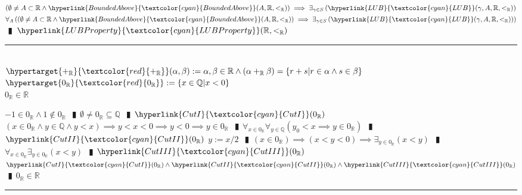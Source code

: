 \documentclass{book}
\newcommand{\df}[1]{\hypertarget{#1}{\textcolor{red}{#1}}}
\newcommand{\wff}[1]{\hypertarget{#1}{\fbox{\textcolor{red}{$#1$}}\phantom{--}}}
\newcommand{\rf}[1]{\hyperlink{#1}{\textcolor{cyan}{#1}}}
\newcommand{\abr}{:=}
\newcommand{\pipe}{$\phantom{(}\vrectangleblack\phantom{)}$}
\newcommand{\pr}[1]{\left(#1\right)}
\begin{document}
\begin{enumerate}
\begin{enumerate}
  \end{enumerate}  
  \lit $\pr{\emptyset \neq A \subset \mathbb{R} \land \rf{BoundedAbove}(A, \mathbb{R}, <_{\mathbb{R}})} \implies \exists_{\gamma \in S}\pr{\rf{LUB}(\gamma, A, \mathbb{R}, <_{\mathbb{R}})}$
  \lit $\forall_{A}\pr{\pr{\emptyset \neq A \subset \mathbb{R} \land \rf{BoundedAbove}(A, \mathbb{R}, <_{\mathbb{R}})} \implies \exists_{\gamma \in S}\pr{\rf{LUB}(\gamma, A, \mathbb{R}, <_{\mathbb{R}})}}$ \pipe $\rf{LUBProperty}(\mathbb{R}, <_{\mathbb{R}})$
\end{enumerate} \vspace{.75mm} \hrule \vspace{.75mm} \ \\

$\df{+_{\mathbb{R}}}(\alpha, \beta) \abr \alpha, \beta \in \mathbb{R} \land (\alpha +_{\mathbb{R}} \beta) = \{r + s | r \in \alpha \land s \in \beta\}$ \\
$\df{0_{\mathbb{R}}} \abr \{x \in \mathbb{Q} | x < 0\}$ \\

\wff{0InR} $0_{\mathbb{R}} \in \mathbb{R}$
\begin{enumerate}
  \lit $-1 \in 0_{\mathbb{R}} \land 1 \notin 0_{\mathbb{R}}$ \pipe $\emptyset \neq 0_{\mathbb{R}} \subseteq \mathbb{Q}$ \pipe $\rf{CutI}(0_{\mathbb{R}})$
  \lit $(x \in 0_{\mathbb{R}} \land y \in \mathbb{Q} \land y < x) \implies y < x < 0 \implies y < 0 \implies y \in 0_{\mathbb{R}}$ \pipe $\forall_{x \in 0_{\mathbb{R}}} \forall_{y \in \mathbb{Q}} (y_0 < x \implies y \in 0_{\mathbb{R}})$ \pipe $\rf{CutII}(0_{\mathbb{R}})$
  \lit $y \abr x / 2$ \pipe $(x \in 0_{\mathbb{R}}) \implies (x < y < 0) \implies \exists_{y \in 0_{\mathbb{R}}}(x < y)$ \pipe $\forall_{x \in 0_{\mathbb{R}}} \exists_{y \in 0_{\mathbb{R}}}(x < y)$ \pipe $\rf{CutIII}(0_{\mathbb{R}})$
  \lit $\rf{CutI}(0_{\mathbb{R}}) \land \rf{CutII}(0_{\mathbb{R}}) \land \rf{CutIII}(0_{\mathbb{R}})$ \pipe $0_{\mathbb{R}} \in \mathbb{R}$
\end{enumerate} \vspace{.75mm} \hrule \vspace{.75mm} \ \\
\end{document}
